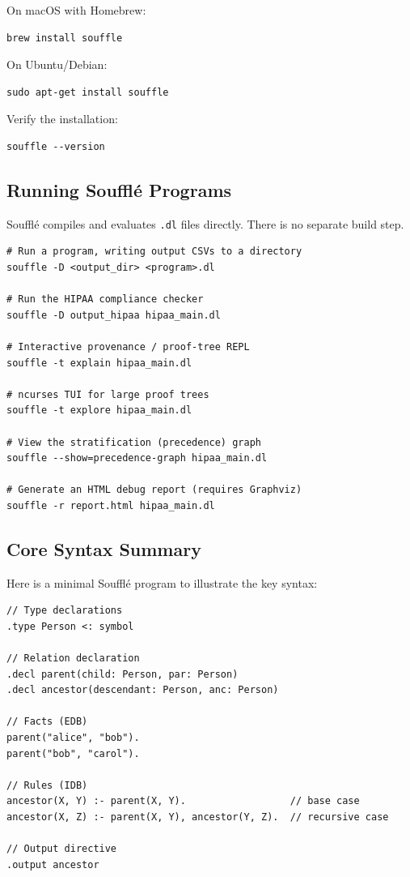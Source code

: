 \documentclass[11pt,letterpaper]{article}
\begin{document}
On macOS with Homebrew:
\begin{lstlisting}[style=bashstyle]
brew install souffle
\end{lstlisting}

On Ubuntu/Debian:
\begin{lstlisting}[style=bashstyle]
sudo apt-get install souffle
\end{lstlisting}

Verify the installation:
\begin{lstlisting}[style=bashstyle]
souffle --version
\end{lstlisting}

\subsection{Running Souffl\'{e} Programs}

Souffl\'{e} compiles and evaluates \texttt{.dl} files directly. There is no separate build step.

\begin{lstlisting}[style=bashstyle]
# Run a program, writing output CSVs to a directory
souffle -D <output_dir> <program>.dl

# Run the HIPAA compliance checker
souffle -D output_hipaa hipaa_main.dl

# Interactive provenance / proof-tree REPL
souffle -t explain hipaa_main.dl

# ncurses TUI for large proof trees
souffle -t explore hipaa_main.dl

# View the stratification (precedence) graph
souffle --show=precedence-graph hipaa_main.dl

# Generate an HTML debug report (requires Graphviz)
souffle -r report.html hipaa_main.dl
\end{lstlisting}

\subsection{Core Syntax Summary}

Here is a minimal Souffl\'{e} program to illustrate the key syntax:

\begin{lstlisting}[style=soufflestyle,caption={Minimal Souffl\'{e} example}]
// Type declarations
.type Person <: symbol

// Relation declaration
.decl parent(child: Person, par: Person)
.decl ancestor(descendant: Person, anc: Person)

// Facts (EDB)
parent("alice", "bob").
parent("bob", "carol").

// Rules (IDB)
ancestor(X, Y) :- parent(X, Y).                  // base case
ancestor(X, Z) :- parent(X, Y), ancestor(Y, Z).  // recursive case

// Output directive
.output ancestor
\end{lstlisting}
\end{document}
